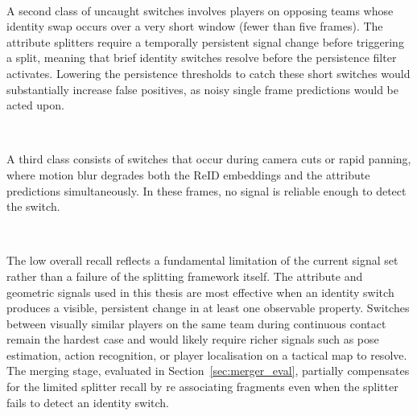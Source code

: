 \

A second class of uncaught switches involves players on opposing teams whose identity swap occurs over a very short window (fewer than five frames). The attribute splitters require a temporally persistent signal change before triggering a split, meaning that brief identity switches resolve before the persistence filter activates. Lowering the persistence thresholds to catch these short switches would substantially increase false positives, as noisy single frame predictions would be acted upon.

\

A third class consists of switches that occur during camera cuts or rapid panning, where motion blur degrades both the ReID embeddings and the attribute predictions simultaneously. In these frames, no signal is reliable enough to detect the switch.

\

The low overall recall reflects a fundamental limitation of the current signal set rather than a failure of the splitting framework itself. The attribute and geometric signals used in this thesis are most effective when an identity switch produces a visible, persistent change in at least one observable property. Switches between visually similar players on the same team during continuous contact remain the hardest case and would likely require richer signals such as pose estimation, action recognition, or player localisation on a tactical map to resolve. The merging stage, evaluated in Section~\ref{sec:merger_eval}, partially compensates for the limited splitter recall by re associating fragments even when the splitter fails to detect an identity switch.
